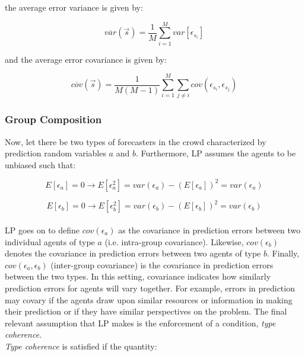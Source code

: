 \documentclass[twoside,twocolumn]{article}
\begin{document}
the average error variance is given by:

\begin{equation}
\label{var}
\overline{var}(\vec{s}) = \frac1M \sum_{i = 1}^M var[\epsilon_{s_i}]
\end{equation}

and the average error covariance is given by:

\begin{equation}
\label{cov}
\overline{cov}(\vec{s}) = \frac{1}{M(M-1)} \sum_{i = 1}^M \sum_{j \neq i}cov(\epsilon_{s_i}, \epsilon_{s_j})
\end{equation}

\subsubsection{Group Composition}

Now, let there be two types of forecasters in the crowd characterized by prediction random variables $a$ and $b$. Furthermore, LP assumes the agents to be unbiased such that:

\begin{equation}
\label{unbiaseda}
E[\epsilon_a] = 0 \rightarrow E[\epsilon_a^2] = var(\epsilon_a) - (E[\epsilon_a])^2 = var(\epsilon_a)
\end{equation}

\begin{equation}
\label{unbiasedb}
E[\epsilon_b] = 0 \rightarrow E[\epsilon_b^2] = var(\epsilon_b) - (E[\epsilon_b])^2 = var(\epsilon_b)
\end{equation}\\

LP goes on to define $cov(\epsilon_a)$ as the covariance in prediction errors between two individual agents of type $a$ (i.e. intra-group covariance). Likewise, $cov(\epsilon_b)$ denotes the covariance in prediction errors between two agents of type $b$. Finally, $cov(\epsilon_a, \epsilon_b)$ (inter-group covariance) is the covariance in prediction errors between the two types. In this setting, covariance indicates how similarly prediction errors for agents will vary together. For example, errors in prediction may covary if the agents draw upon similar resources or information in making their prediction or if they have similar perspectives on the problem. The final relevant assumption that LP makes is the enforcement of a condition, \textit{type coherence}.\\

\textit{Type coherence} is satisfied if the quantity:
\end{document}
